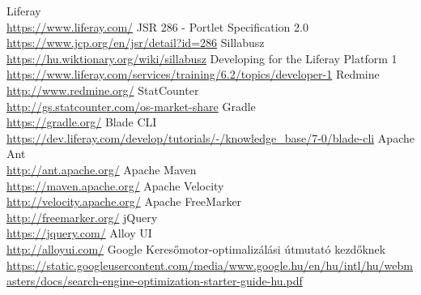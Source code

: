 \documentclass[hidelinks, 12pt, a4paper]{report}
\begin{document}
\begin{thebibliography}{10}
 Liferay \\ \small\url{https://www.liferay.com/}
 JSR 286 - Portlet Specification 2.0 \\ \small\url{https://www.jcp.org/en/jsr/detail?id=286}
 Sillabusz \\ \small\url{https://hu.wiktionary.org/wiki/sillabusz}
 Developing for the Liferay Platform 1 \\ \small\url{https://www.liferay.com/services/training/6.2/topics/developer-1}
 Redmine \\ \small\url{http://www.redmine.org/}
 StatCounter \\ \small\url{http://gs.statcounter.com/os-market-share}
 Gradle \\ \small\url{https://gradle.org/}
 Blade CLI \\ \small\url{https://dev.liferay.com/develop/tutorials/-/knowledge_base/7-0/blade-cli}
 Apache Ant \\ \small\url{http://ant.apache.org/}
 Apache Maven \\ \small\url{https://maven.apache.org/}
 Apache Velocity \\ \small\url{http://velocity.apache.org/}
 Apache FreeMarker \\ \small\url{http://freemarker.org/}
 jQuery \\ \small\url{https://jquery.com/}
 Alloy UI \\ \small\url{http://alloyui.com/}
 Google Keresőmotor-optimalizálási
útmutató kezdőknek \\ \small\url{https://static.googleusercontent.com/media/www.google.hu/en/hu/intl/hu/webmasters/docs/search-engine-optimization-starter-guide-hu.pdf}

\end{thebibliography}





\end{document}
